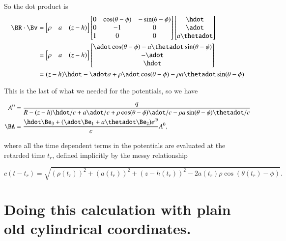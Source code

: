 So the dot product is
\begin{align*}
\BR \cdot \Bv 
&=
\begin{bmatrix}
\rho &
a & 
(z - h)
\end{bmatrix}
\begin{bmatrix}
0 & \cos(\theta-\phi)  & - \sin(\theta - \phi) \\
0 & - 1  & 0 \\
1 & 0 & 0 \\
\end{bmatrix}
\begin{bmatrix}
\hdot \\
\adot \\
a \thetadot
\end{bmatrix} \\
&=
\begin{bmatrix}
\rho &
a & 
(z - h)
\end{bmatrix}
\begin{bmatrix}
\adot \cos(\theta - \phi) - a \thetadot \sin(\theta - \phi) \\
- \adot \\
\hdot
\end{bmatrix} \\
&=
(z - h) \hdot - \adot a + \rho \adot \cos(\theta - \phi) - \rho a \thetadot \sin(\theta - \phi) 
\end{align*}

This is the last of what we needed for the potentials, so we have

\begin{align}\label{eqn:matrixVectorPotentials:250}
A^0 &= \frac{q}{
R
-(z - h) \hdot/c + a \adot/c + \rho \cos(\theta - \phi) \adot/c - \rho a \sin(\theta - \phi) \thetadot/c
} \\
\BA &= \frac{ \hdot \Be_3 + (\adot \Be_1 + a \thetadot \Be_2) e^{i\theta} }{c} A^0,
\end{align}

where all the time dependent terms in the potentials are evaluated at the retarded time $t_r$, defined implicitly by the messy relationship

\begin{equation}\label{eqn:matrixVectorPotentials:270}
c(t - t_r) = \sqrt{(\rho(t_r))^2 + (a(t_r))^2 + (z -h(t_r))^2 - 2 a(t_r) \rho \cos(\theta(t_r) - \phi)} .
\end{equation}

\section{Doing this calculation with plain old cylindrical coordinates.}

